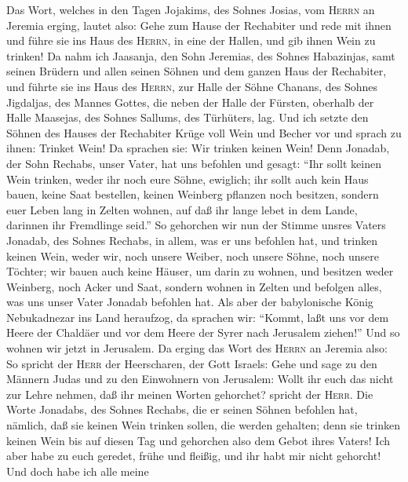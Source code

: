  Das Wort, welches in den Tagen Jojakims, des Sohnes
Josias, vom \textsc{Herrn} an Jeremia erging, lautet also:
 Gehe zum Hause der Rechabiter und rede mit ihnen und
führe sie ins Haus des \textsc{Herrn}, in eine der Hallen, und gib ihnen
Wein zu trinken!  Da nahm ich Jaasanja, den Sohn Jeremias,
des Sohnes Habazinjas, samt seinen Brüdern und allen seinen Söhnen und
dem ganzen Haus der Rechabiter,  und führte sie ins Haus
des \textsc{Herrn}, zur Halle der Söhne Chanans, des Sohnes Jigdaljas,
des Mannes Gottes, die neben der Halle der Fürsten, oberhalb der Halle
Maasejas, des Sohnes Sallums, des Türhüters, lag.  Und ich
setzte den Söhnen des Hauses der Rechabiter Krüge voll Wein und Becher
vor und sprach zu ihnen: Trinket Wein!  Da sprachen sie:
Wir trinken keinen Wein! Denn Jonadab, der Sohn Rechabs, unser Vater,
hat uns befohlen und gesagt: ``Ihr sollt keinen Wein trinken, weder ihr
noch eure Söhne, ewiglich;  ihr sollt auch kein Haus
bauen, keine Saat bestellen, keinen Weinberg pflanzen noch besitzen,
sondern euer Leben lang in Zelten wohnen, auf daß ihr lange lebet in dem
Lande, darinnen ihr Fremdlinge seid.''  So gehorchen wir
nun der Stimme unsres Vaters Jonadab, des Sohnes Rechabs, in allem, was
er uns befohlen hat, und trinken keinen Wein, weder wir, noch unsere
Weiber, noch unsere Söhne, noch unsere Töchter;  wir bauen
auch keine Häuser, um darin zu wohnen, und besitzen weder Weinberg, noch
Acker und Saat,  sondern wohnen in Zelten und befolgen
alles, was uns unser Vater Jonadab befohlen hat.  Als
aber der babylonische König Nebukadnezar ins Land heraufzog, da sprachen
wir: ``Kommt, laßt uns vor dem Heere der Chaldäer und vor dem Heere der
Syrer nach Jerusalem ziehen!'' Und so wohnen wir jetzt in Jerusalem.
 Da erging das Wort des \textsc{Herrn} an Jeremia also:
 So spricht der \textsc{Herr} der Heerscharen, der Gott
Israels: Gehe und sage zu den Männern Judas und zu den Einwohnern von
Jerusalem: Wollt ihr euch das nicht zur Lehre nehmen, daß ihr meinen
Worten gehorchet? spricht der \textsc{Herr}.  Die Worte
Jonadabs, des Sohnes Rechabs, die er seinen Söhnen befohlen hat,
nämlich, daß sie keinen Wein trinken sollen, die werden gehalten; denn
sie trinken keinen Wein bis auf diesen Tag und gehorchen also dem Gebot
ihres Vaters! Ich aber habe zu euch geredet, frühe und fleißig, und ihr
habt mir nicht gehorcht!  Und doch habe ich alle meine
